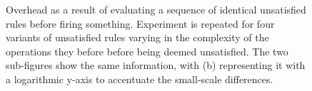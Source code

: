 \begin{figure}
	\centering
	\caption[Overhead of evaluating unsatisfied rules.]{Overhead as a result of evaluating a sequence of identical unsatisfied rules before firing something. Experiment is repeated for four variants of unsatisfied rules varying in the complexity of the operations they before before being deemed unsatisfied. The two sub-figures show the same information, with (b) representing it with a logarithmic y-axis to accentuate the small-scale differences.}
	\label{fig:check_time}
\end{figure}

